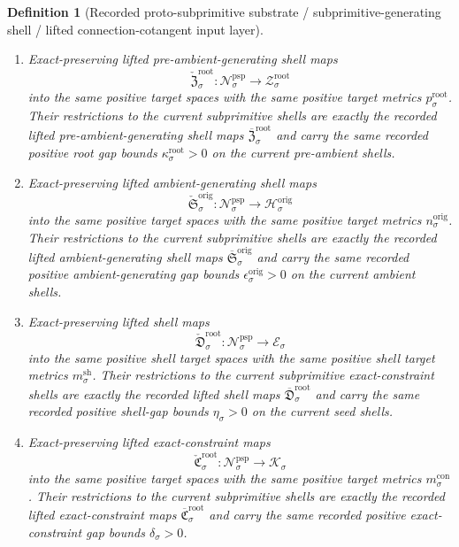 \documentclass[11pt]{article}
\newcommand{\ShellTarget}[1]{\mathcal E_{#1}}
\newcommand{\ShellMetric}[1]{m_{#1}^{\mathrm{sh}}}
\newcommand{\ShellGap}[1]{\eta_{#1}}
\newcommand{\ConstraintTarget}[1]{\mathcal K_{#1}}
\newcommand{\ConstraintMetric}[1]{m_{#1}^{\mathrm{con}}}
\newcommand{\ConstraintGap}[1]{\delta_{#1}}
\newcommand{\OriginTarget}[1]{\mathcal H_{#1}^{\mathrm{orig}}}
\newcommand{\OriginTargetMetric}[1]{n_{#1}^{\mathrm{orig}}}
\newcommand{\OriginGap}[1]{\epsilon_{#1}^{\mathrm{orig}}}
\newcommand{\RootTarget}[1]{\mathcal Z_{#1}^{\mathrm{root}}}
\newcommand{\RootTargetMetric}[1]{p_{#1}^{\mathrm{root}}}
\newcommand{\RootGap}[1]{\kappa_{#1}^{\mathrm{root}}}
\newcommand{\PrimTarget}[1]{\mathcal W_{#1}^{\mathrm{prim}}}
\newcommand{\PrimTargetMetric}[1]{q_{#1}^{\mathrm{prim}}}
\newcommand{\PrimGap}[1]{\lambda_{#1}^{\mathrm{prim}}}
\newcommand{\SubprimLiftedRoot}[1]{\overline{\mathfrak P}_{#1}^{\mathrm{prim}}}
\newcommand{\SubprimLiftedPreAmbient}[1]{\overline{\mathfrak Z}_{#1}^{\mathrm{root}}}
\newcommand{\SubprimLiftedAmbient}[1]{\overline{\mathfrak S}_{#1}^{\mathrm{orig}}}
\newcommand{\SubprimLiftedShell}[1]{\overline{\mathfrak D}_{#1}^{\mathrm{root}}}
\newcommand{\SubprimConstraintMap}[1]{\overline{\mathfrak C}_{#1}^{\mathrm{root}}}
\newcommand{\ProtoSubprimSpace}[1]{\mathcal N_{#1}^{\mathrm{psp}}}
\newcommand{\ProtoSubprimLiftedRoot}[1]{\check{\mathfrak P}_{#1}^{\mathrm{prim}}}
\newcommand{\ProtoSubprimLiftedPreAmbient}[1]{\check{\mathfrak Z}_{#1}^{\mathrm{root}}}
\newcommand{\ProtoSubprimLiftedAmbient}[1]{\check{\mathfrak S}_{#1}^{\mathrm{orig}}}
\newcommand{\ProtoSubprimLiftedShell}[1]{\check{\mathfrak D}_{#1}^{\mathrm{root}}}
\newcommand{\ProtoSubprimConstraintMap}[1]{\check{\mathfrak C}_{#1}^{\mathrm{root}}}
\newtheorem{definition}{Definition}
\begin{document}
\begin{definition}[Recorded proto-subprimitive substrate / subprimitive-generating shell / lifted connection-cotangent input layer]
\begin{enumerate}
    \[
    \ProtoSubprimLiftedRoot{\sigma}:\ProtoSubprimSpace{\sigma}\to\PrimTarget{\sigma}
    \]
    into the same positive target spaces with the same positive target metrics \(\PrimTargetMetric{\sigma}\). Their restrictions to the current subprimitive shells are exactly the recorded lifted root-generating shell maps \(\SubprimLiftedRoot{\sigma}\) and carry the same recorded positive primitive gap bounds \(\PrimGap{\sigma}>0\) on the current root shells.
    \item Exact-preserving lifted pre-ambient-generating shell maps
    \[
    \ProtoSubprimLiftedPreAmbient{\sigma}:\ProtoSubprimSpace{\sigma}\to\RootTarget{\sigma}
    \]
    into the same positive target spaces with the same positive target metrics \(\RootTargetMetric{\sigma}\). Their restrictions to the current subprimitive shells are exactly the recorded lifted pre-ambient-generating shell maps \(\SubprimLiftedPreAmbient{\sigma}\) and carry the same recorded positive root gap bounds \(\RootGap{\sigma}>0\) on the current pre-ambient shells.
    \item Exact-preserving lifted ambient-generating shell maps
    \[
    \ProtoSubprimLiftedAmbient{\sigma}:\ProtoSubprimSpace{\sigma}\to\OriginTarget{\sigma}
    \]
    into the same positive target spaces with the same positive target metrics \(\OriginTargetMetric{\sigma}\). Their restrictions to the current subprimitive shells are exactly the recorded lifted ambient-generating shell maps \(\SubprimLiftedAmbient{\sigma}\) and carry the same recorded positive ambient-generating gap bounds \(\OriginGap{\sigma}>0\) on the current ambient shells.
    \item Exact-preserving lifted shell maps
    \[
    \ProtoSubprimLiftedShell{\sigma}:\ProtoSubprimSpace{\sigma}\to\ShellTarget{\sigma}
    \]
    into the same positive shell target spaces with the same positive shell target metrics \(\ShellMetric{\sigma}\). Their restrictions to the current subprimitive exact-constraint shells are exactly the recorded lifted shell maps \(\SubprimLiftedShell{\sigma}\) and carry the same recorded positive shell-gap bounds \(\ShellGap{\sigma}>0\) on the current seed shells.
    \item Exact-preserving lifted exact-constraint maps
    \[
    \ProtoSubprimConstraintMap{\sigma}:\ProtoSubprimSpace{\sigma}\to\ConstraintTarget{\sigma}
    \]
    into the same positive target spaces with the same positive target metrics \(\ConstraintMetric{\sigma}\). Their restrictions to the current subprimitive shells are exactly the recorded lifted exact-constraint maps \(\SubprimConstraintMap{\sigma}\) and carry the same recorded positive exact-constraint gap bounds \(\ConstraintGap{\sigma}>0\).

\end{enumerate}
\end{definition}
\end{document}
